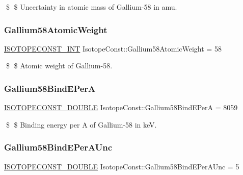 \$ \$ Uncertainty in atomic mass of Gallium-\/58 in amu. \mbox{\label{group___isotope_const-_gallium-_ga58_ga46229ed1275110505d9c53d6de5722d2}} 
\subsubsection{\texorpdfstring{Gallium58\+Atomic\+Weight}{Gallium58AtomicWeight}}
{\footnotesize\ttfamily \mbox{\hyperlink{group___isotope_const-_macros_ga5f18360b3e99483a35c32d789e62621c}{I\+S\+O\+T\+O\+P\+E\+C\+O\+N\+S\+T\+\_\+\+I\+NT}} Isotope\+Const\+::\+Gallium58\+Atomic\+Weight = 58}

\$ \$ Atomic weight of Gallium-\/58. \mbox{\label{group___isotope_const-_gallium-_ga58_gaacf65394fbc156db708654bb675b5bcf}} 
\subsubsection{\texorpdfstring{Gallium58\+Bind\+E\+PerA}{Gallium58BindEPerA}}
{\footnotesize\ttfamily \mbox{\hyperlink{group___isotope_const-_macros_ga8f45a7272ce02c0b4c65c44636ed719a}{I\+S\+O\+T\+O\+P\+E\+C\+O\+N\+S\+T\+\_\+\+D\+O\+U\+B\+LE}} Isotope\+Const\+::\+Gallium58\+Bind\+E\+PerA = 8059}

\$ \$ Binding energy per A of Gallium-\/58 in keV. \mbox{\label{group___isotope_const-_gallium-_ga58_ga01671a3b07404058dc67ed19b0c6d581}} 
\subsubsection{\texorpdfstring{Gallium58\+Bind\+E\+Per\+A\+Unc}{Gallium58BindEPerAUnc}}
{\footnotesize\ttfamily \mbox{\hyperlink{group___isotope_const-_macros_ga8f45a7272ce02c0b4c65c44636ed719a}{I\+S\+O\+T\+O\+P\+E\+C\+O\+N\+S\+T\+\_\+\+D\+O\+U\+B\+LE}} Isotope\+Const\+::\+Gallium58\+Bind\+E\+Per\+A\+Unc = 5}

